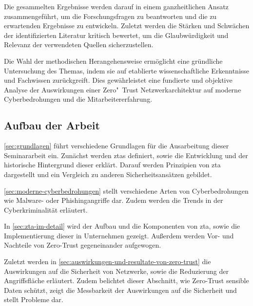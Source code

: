 Die gesammelten Ergebnisse werden darauf in einem ganzheitlichen Ansatz zusammengeführt, um die Forschungsfragen zu beantworten und die zu erwartenden Ergebnisse zu entwickeln.
Zuletzt werden die Stärken und Schwächen der identifizierten Literatur kritisch bewertet, um die Glaubwürdigkeit und Relevanz der verwendeten Quellen sicherzustellen.

Die Wahl der methodischen Herangehensweise ermöglicht eine gründliche Untersuchung des Themas, indem sie auf etablierte wissenschaftliche Erkenntnisse und Fachwissen zurückgreift.
Dies gewährleistet eine fundierte und objektive Analyse der Auswirkungen einer Zero"~Trust Netzwerkarchitektur auf moderne Cyberbedrohungen und die Mitarbeitererfahrung.

\subsection{Aufbau der Arbeit}\label{subsec:aufbau-der-arbeit}
\autoref{sec:grundlagen} führt verschiedene Grundlagen für die Ausarbeitung dieser Seminararbeit ein.
Zunächst werden \glspl{zta} definiert, sowie die Entwicklung und der historische Hintergrund dieser erklärt.
Darauf werden Prinzipien von \gls{zta} dargestellt und ein Vergleich zu anderen Sicherheitsansätzen gebildet.

\autoref{sec:moderne-cyberbedrohungen} stellt verschiedene Arten von Cyberbedrohungen wie Malware- oder Phishingangriffe dar.
Zudem werden die Trends in der Cyberkriminalität erläutert.

In \autoref{sec:zta-im-detail} wird der Aufbau und die Komponenten von \gls{zta}, sowie die Implementierung dieser in Unternehmen gezeigt.
Außerdem werden Vor- und Nachteile von Zero-Trust gegeneinander aufgewogen.

Zuletzt werden in \autoref{sec:auswirkungen-und-resultate-von-zero-trust} die Auswirkungen auf die Sicherheit von Netzwerke, sowie die Reduzierung der Angriffsfläche erläutert.
Zudem belichtet dieser Abschnitt, wie Zero-Trust sensible Daten schützt, zeigt die Messbarkeit der Auswirkungen auf die Sicherheit und stellt Probleme dar.